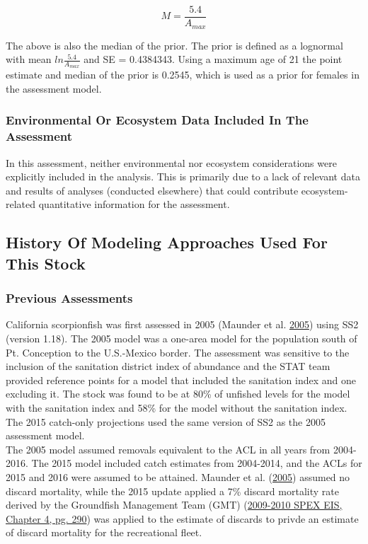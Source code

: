 \documentclass[12pt,]{article}
\begin{document}
\begin{equation}
M = \frac{5.4}{A_{max}}
\end{equation}

The above is also the median of the prior. The prior is defined as a
lognormal with mean \(ln\frac{5.4}{A_{max}}\) and SE = 0.4384343. Using
a maximum age of 21 the point estimate and median of the prior is
0.2545, which is used as a prior for females in the assessment model.

\vspace{.5cm}

\subsubsection{Environmental Or Ecosystem Data Included In The
Assessment}\label{environmental-or-ecosystem-data-included-in-the-assessment}

In this assessment, neither environmental nor ecosystem considerations
were explicitly included in the analysis. This is primarily due to a
lack of relevant data and results of analyses (conducted elsewhere) that
could contribute ecosystem-related quantitative information for the
assessment.

\subsection{History Of Modeling Approaches Used For This
Stock}\label{history-of-modeling-approaches-used-for-this-stock}

\subsubsection{Previous Assessments}\label{previous-assessments}

California scorpionfish was first assessed in 2005 (Maunder et al.
\protect\hyperlink{ref-Maunder2005}{2005}) using SS2 (version 1.18). The
2005 model was a one-area model for the population south of Pt.
Conception to the U.S.-Mexico border. The assessment was sensitive to
the inclusion of the sanitation district index of abundance and the STAT
team provided reference points for a model that included the sanitation
index and one excluding it. The stock was found to be at 80\% of
unfished levels for the model with the sanitation index and 58\% for the
model without the sanitation index. The 2015 catch-only projections used
the same version of SS2 as the 2005 assessment model.\\
The 2005 model assumed removals equivalent to the ACL in all years from
2004-2016. The 2015 model included catch estimates from 2004-2014, and
the ACLs for 2015 and 2016 were assumed to be attained. Maunder et al.
(\protect\hyperlink{ref-Maunder2005}{2005}) assumed no discard
mortality, while the 2015 update applied a 7\% discard mortality rate
derived by the Groundfish Management Team (GMT)
(\href{http://www.pcouncil.org/wp-content/uploads/chp4_0910.pdf}{2009-2010
SPEX EIS, Chapter 4, pg. 290}) was applied to the estimate of discards
to privde an estimate of discard mortality for the recreational fleet.
\end{document}
